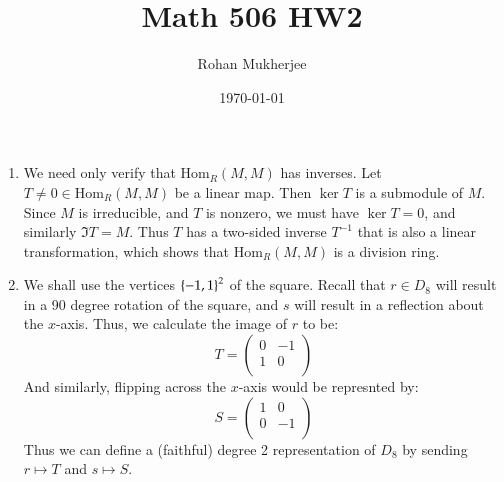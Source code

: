\documentclass[12pt]{article}
\title{Math 506 HW2}
\date{\today}
\author{Rohan Mukherjee}
\theoremstyle{definitionstyle}
\newcommand{\SET}[1]{\Set{\mskip-\medmuskip #1 \mskip-\medmuskip}}
\newcommand{\Hom}{\mathrm{Hom}_R}
\begin{document}
	\maketitle
	\begin{enumerate}
		\item We need only verify that $\Hom(M, M)$ has inverses. Let $T \neq 0 \in \Hom(M, M)$ be a linear map. Then $\ker T$ is a submodule of $M$. Since $M$ is irreducible, and $T$ is nonzero, we must have $\ker T = 0$, and similarly $\Im T = M$. Thus $T$ has a two-sided inverse $T^{-1}$ that is also a linear transformation, which shows that $\Hom(M, M)$ is a division ring.
		
		\item We shall use the vertices $\SET{-1, 1}^2$ of the square. Recall that $r \in D_8$ will result in a 90 degree rotation of the square, and $s$ will result in a reflection about the $x$-axis. Thus, we calculate the image of $r$ to be:
		\[T = \begin{pmatrix}
			0 & -1 \\
			1 & 0 \\
			\end{pmatrix}\]
		And similarly, flipping across the $x$-axis would be represnted by:
		\[S = \begin{pmatrix}
			1 & 0 \\
			0 & -1 \\
			\end{pmatrix}\]
		Thus we can define a (faithful) degree 2 representation of $D_8$ by sending $r \mapsto T$ and $s \mapsto S$.


\end{enumerate}
\end{document}
